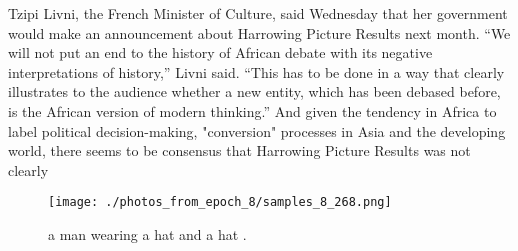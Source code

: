 \documentclass{article}%
\begin{document}
Tzipi Livni, the French Minister of Culture, said Wednesday that her government would make an announcement about Harrowing Picture Results next month.\newline%
“We will not put an end to the history of African debate with its negative interpretations of history,” Livni said. “This has to be done in a way that clearly illustrates to the audience whether a new entity, which has been debased before, is the African version of modern thinking.”\newline%
And given the tendency in Africa to label political decision{-}making, "conversion" processes in Asia and the developing world, there seems to be consensus that Harrowing Picture Results was not clearly

%


\begin{figure}[h!]%
\centering%
\texttt{[image: ./photos\_from\_epoch\_8/samples\_8\_268.png]}%
\caption{a man wearing a hat and a hat .}%
\end{figure}

%
\end{document}
